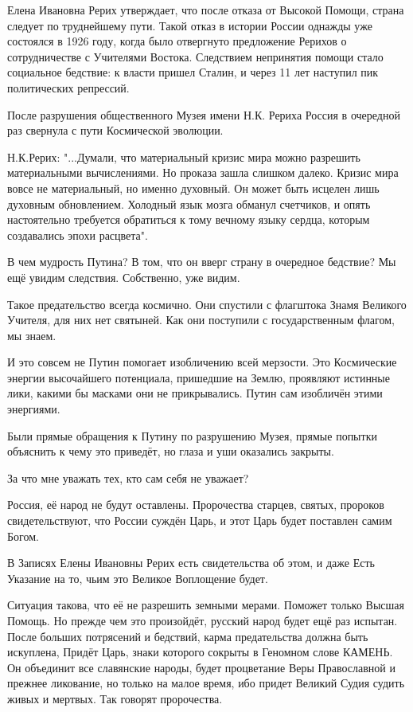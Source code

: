 \begin{itemize}
\begin{itemize}
Елена Ивановна Рерих утверждает, что после отказа от Высокой Помощи, страна
следует по труднейшему пути. Такой отказ в истории России однажды уже состоялся
в 1926 году, когда было отвергнуто предложение Рерихов о сотрудничестве с
Учителями Востока. Следствием непринятия помощи стало социальное бедствие: к
власти пришел Сталин, и через 11 лет наступил пик политических репрессий.

После разрушения общественного Музея имени Н.К. Рериха Россия в очередной раз
свернула с пути Космической эволюции.

Н.К.Рерих: "...Думали, что материальный кризис мира можно разрешить материальными
вычислениями. Но проказа зашла слишком далеко. Кризис мира вовсе не
материальный, но именно духовный. Он может быть исцелен лишь духовным
обновлением. Холодный язык мозга обманул счетчиков, и опять настоятельно
требуется обратиться к тому вечному языку сердца, которым создавались эпохи
расцвета".

 

В чем мудрость Путина? В том, что он вверг страну в очередное бедствие? Мы ещё
увидим следствия. Собственно, уже видим.

Такое предательство всегда космично. Они спустили с флагштока Знамя Великого
Учителя, для них нет святыней. Как они поступили с государственным флагом, мы
знаем.

И это совсем не Путин помогает изобличению всей мерзости. Это Космические
энергии высочайшего потенциала, пришедшие на Землю, проявляют истинные лики,
какими бы масками они не прикрывались. Путин сам изобличён этими энергиями.

Были прямые обращения к Путину по разрушению Музея, прямые попытки объяснить к
чему это приведёт, но глаза и уши оказались закрыты.

За что мне уважать тех, кто сам себя не уважает?

Россия, её народ не будут оставлены. Пророчества старцев, святых, пророков
свидетельствуют, что России суждён Царь, и этот Царь будет поставлен самим
Богом.

В Записях Елены Ивановны Рерих есть свидетельства об этом, и даже Есть Указание на то, чьим это Великое Воплощение будет.

Ситуация такова, что её не разрешить земными мерами. Поможет только Высшая
Помощь. Но прежде чем это произойдёт, русский народ будет ещё раз испытан.
После больших потрясений и бедствий, карма предательства должна быть искуплена,
Придёт Царь, знаки которого сокрыты в Геномном слове КАМЕНЬ. Он объединит все
славянские народы, будет процветание Веры Православной и прежнее ликование, но
только на малое время, ибо придет Великий Судия судить живых и мертвых. Так
говорят пророчества.


\end{itemize}
\end{itemize}
